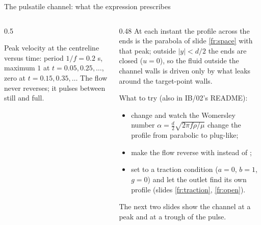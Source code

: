 \documentclass[aspectratio=169,11pt]{beamer}
\begin{document}
\begin{frame}{The pulsatile channel: what the expression prescribes}
\label{fr:ib02b}
\begin{columns}[T,onlytextwidth]
\begin{column}{0.5\textwidth}
\centering
{}
\vspace{2mm}

\small Peak velocity at the centreline versus time: period $1/f = 0.2$ s, maximum $1$ at $t = 0.05, 0.25, \ldots$, zero at $t = 0.15, 0.35, \ldots$ The flow never reverses; it pulses between still and full.
\end{column}
\begin{column}{0.48\textwidth}
\small At each instant the profile across the ends is the parabola of slide \ref{fr:space} with that peak; outside $|y| < d/2$ the ends are closed ($u = 0$), so the fluid outside the channel walls is driven only by what leaks around the target-point walls.
\vspace{1mm}

\small What to try (also in IB/02's README):
\begin{itemize}
  \item change  and watch the Womersley number $\alpha = \tfrac{d}{2}\sqrt{2\pi f\rho/\mu}$ change the profile from parabolic to plug-like;
  \item make the flow reverse with  instead of ;
  \item set  to a traction condition ($a = 0$, $b = 1$, $g = 0$) and let the outlet find its own profile (slides \ref{fr:traction}, \ref{fr:open}).
\end{itemize}
\small The next two slides show the channel at a peak and at a trough of the pulse.
\end{column}
\end{columns}
\end{frame}
\end{document}
